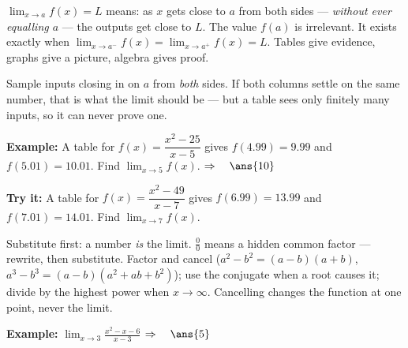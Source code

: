 \documentclass[12pt]{article}
\begin{document}

\begin{formulabox}
$\displaystyle\lim_{x\to a}f(x)=L$ means: as $x$ gets close to $a$ from both
sides --- \emph{without ever equalling $a$} --- the outputs get close to $L$. The
value $f(a)$ is irrelevant. It exists exactly when
$\lim_{x\to a^-}f(x)=\lim_{x\to a^+}f(x)=L$. Tables give evidence, graphs give a
picture, algebra gives proof.
\end{formulabox}


\begin{formulabox}
Sample inputs closing in on $a$ from \emph{both} sides. If both columns settle
on the same number, that is what the limit should be --- but a table sees only
finitely many inputs, so it can never prove one.
\end{formulabox}

\begin{examplebox}
\textbf{Example:} A table for $f(x)=\dfrac{x^2-25}{x-5}$ gives $f(4.99)=9.99$
and $f(5.01)=10.01$. Find $\displaystyle\lim_{x\to5}f(x)$.
$\Rightarrow\quad \ans{10}$
\end{examplebox}

\begin{tryitbox}
\textbf{Try it:} A table for $f(x)=\dfrac{x^2-49}{x-7}$ gives $f(6.99)=13.99$
and $f(7.01)=14.01$. Find $\displaystyle\lim_{x\to7}f(x)$.\\[2pt]
\end{tryitbox}


\begin{formulabox}
Substitute first: a number \emph{is} the limit. $\tfrac{0}{0}$ means a hidden
common factor --- rewrite, then substitute. Factor and cancel
($a^2-b^2=(a-b)(a+b)$, $a^3-b^3=(a-b)(a^2+ab+b^2)$); use the conjugate when a
root causes it; divide by the highest power when $x\to\infty$. Cancelling
changes the function at one point, never the limit.
\end{formulabox}

\begin{examplebox}
\textbf{Example:} $\displaystyle\lim_{x\to3}\frac{x^2-x-6}{x-3}$
$\Rightarrow\quad \ans{5}$
\end{examplebox}
\end{document}
